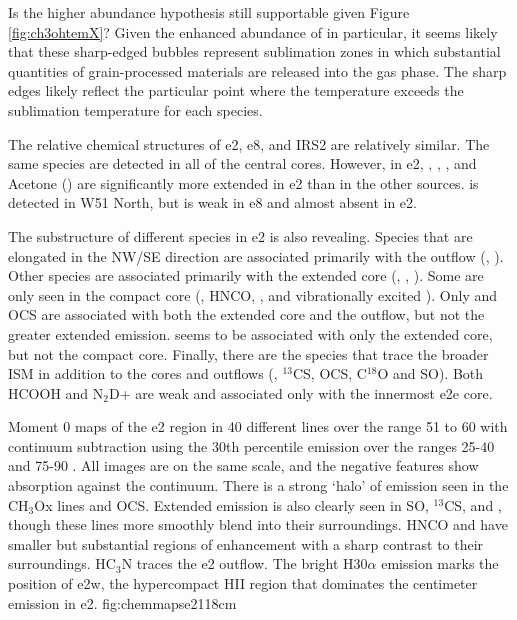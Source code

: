 \documentclass{aa}
\begin{document}
{\color{red} Is the higher abundance hypothesis still supportable given Figure
\ref{fig:ch3ohtemX}?}
Given the enhanced abundance of \methanol in particular, it seems likely that these
sharp-edged bubbles represent sublimation zones in which substantial quantities
of grain-processed materials are released into the gas phase.  The sharp edges
likely reflect the particular point where the temperature exceeds the sublimation
temperature for each species.

The relative chemical structures of e2, e8, and IRS2 are relatively similar.
The same species are detected in all of the central cores.  However, in e2,
\dimethylether, \methylformate, \ethylcyanide, and Acetone (\acetone) are
significantly more extended in e2 than in the other sources.
\gaucheethanol is detected in W51 North, but is weak in e8 and almost absent
in e2.

The substructure of different species in e2 is also revealing.  Species that
are elongated in the NW/SE direction are associated primarily with the outflow
(\cyanoacetylene, \ethylcyanide).  Other species are associated primarily with
the extended core (\methylformate, \dimethylether, \acetone).  Some are only
seen in the compact core (\methyleneamidogen, HNCO, \formamide, and
vibrationally excited \cyanoacetylene).  Only \methanol and OCS are associated
with both the extended core and the outflow, but not the greater extended
emission.  \ketene seems to be associated with only the extended core, but not
the compact core. Finally, there are the species that trace the broader ISM in
addition to the cores and outflows (\formaldehyde, $^{13}$CS, OCS, C$^{18}$O
and SO).  Both HCOOH and N$_2$D+ are weak and associated only with the innermost
e2e core.

{Moment 0 maps of the e2 region in 40 different lines over the range 51 to 60
\kms with continuum subtraction using the 30th percentile emission
over the ranges 25-40 and 75-90 \kms.  All images are on the same scale, and
the negative features show absorption against the continuum.  There
is a strong `halo' of emission seen in the CH$_3$Ox lines and OCS.  Extended
emission is also clearly seen in SO, $^{13}$CS, and \formaldehyde, though these
lines more smoothly blend into their surroundings.  HNCO and \formamide have
smaller but substantial regions of enhancement with a sharp contrast to their
surroundings.  HC$_3$N traces the e2 outflow.  The bright H30$\alpha$ emission
marks the position of e2w, the hypercompact HII region that dominates the
centimeter emission in e2.
}{fig:chemmapse2}{1}{18cm}
\end{document}
